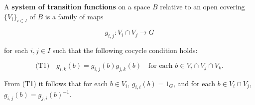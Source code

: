 A \textbf{system of transition functions} on a space $B$ relative to an open covering $\{V_i\}_{i \in I}$ of $B$ is a family of maps

$$g_{i,j}: V_i \cap V_j \to G$$

for each $i, j \in I$ such that the following cocycle condition holds:

$$\text{(T1)} \quad g_{i,k}(b) = g_{i,j}(b) g_{j,k}(b) \quad \text{for each } b \in V_i \cap V_j \cap V_k.$$

From (T1) it follows that for each $b \in V_i$, $g_{i,i}(b) = 1_G$, and for each $b \in V_i \cap V_j$, $g_{i,j}(b) = g_{j,i}(b)^{-1}$.
